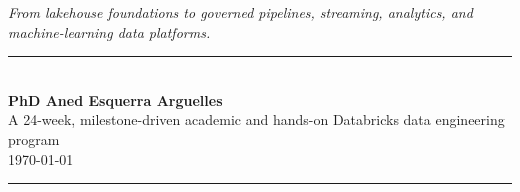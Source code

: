 \begin{titlepage}
{\large\itshape\color{primarydark}%
 From lakehouse foundations to governed pipelines, streaming, analytics, and machine-learning data platforms.}

\vfill

{\color{primary}\rule{\textwidth}{1pt}}\\[0.45cm]
{\LARGE\bfseries\color{primarydark} PhD Aned Esquerra Arguelles}\\[0.30cm]
{\large\color{codegray} A 24-week, milestone-driven academic and hands-on Databricks data engineering program}\\[0.30cm]
{\large\color{codegray} \today}\\[0.45cm]
{\color{primary}\rule{\textwidth}{1pt}}
\end{titlepage}
